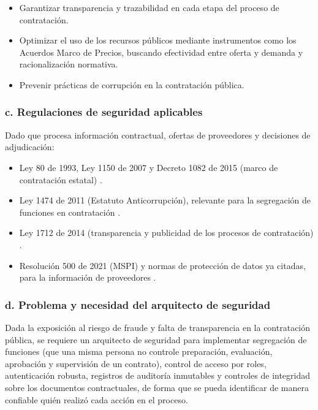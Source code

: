 \begin{itemize}
	\item Garantizar transparencia y trazabilidad en cada etapa del proceso de contratación.
	\item Optimizar el uso de los recursos públicos mediante instrumentos como los Acuerdos Marco de Precios, buscando efectividad entre oferta y demanda y racionalización normativa.
	\item Prevenir prácticas de corrupción en la contratación pública.
\end{itemize}

\subsubsection*{c. Regulaciones de seguridad aplicables}

Dado que procesa información contractual, ofertas de proveedores y decisiones de adjudicación:

\begin{itemize}
	\item Ley 80 de 1993, Ley 1150 de 2007 y Decreto 1082 de 2015 (marco de contratación estatal) \parencite{ley80de1993,ley1150de2007,decreto1082de2015}.
	\item Ley 1474 de 2011 (Estatuto Anticorrupción), relevante para la segregación de funciones en contratación \parencite{ley1474de2011}.
	\item Ley 1712 de 2014 (transparencia y publicidad de los procesos de contratación) \parencite{ley1712de2014}.
	\item Resolución 500 de 2021 (MSPI) y normas de protección de datos ya citadas, para la información de proveedores \parencite{mintic2021}.
\end{itemize}

\subsubsection*{d. Problema y necesidad del arquitecto de seguridad}

Dada la exposición al riesgo de fraude y falta de transparencia en la contratación pública, se requiere un arquitecto de seguridad para implementar segregación de funciones (que una misma persona no controle preparación, evaluación, aprobación y supervisión de un contrato), control de acceso por roles, autenticación robusta, registros de auditoría inmutables y controles de integridad sobre los documentos contractuales, de forma que se pueda identificar de manera confiable quién realizó cada acción en el proceso.

